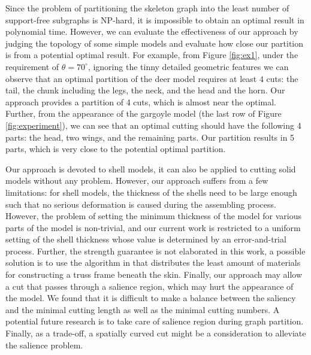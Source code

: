 Since the problem of partitioning the skeleton graph into the least number of support-free subgraphs is NP-hard, it is impossible to obtain an optimal result in polynomial time. However, we can evaluate the effectiveness of our approach by judging the topology of some simple models and evaluate how close our partition is from a potential optimal result. For example, from Figure \ref{fig:ex1}, under the requirement of $\theta = 70^{\circ}$, ignoring the tinny detailed geometric features we can observe that an optimal partition of the deer model requires at least $4$ cuts: the tail, the chunk including the legs, the neck, and the head and the horn. Our approach provides a partition of 4 cuts, which is almost near the optimal. Further, from the appearance of the gargoyle model (the last row of Figure \ref{fig:experiment}), we can see that an optimal cutting should have the following 4 parts: the head, two wings, and the remaining parts. Our partition results in 5 parts, which is very close to the potential optimal partition.

Our approach is devoted to shell models, it can also be applied to cutting solid models without any problem. However, our approach suffers from a few limitations: for shell models, the thickness of the shells need to be large enough such that no serious deformation is caused during the assembling process. However, the problem of setting the minimum thickness of the model for various parts of the model is non-trivial, and our current work is restricted to a uniform setting of the shell thickness whose value is determined by an error-and-trial process. Further, the strength guarantee is not elaborated in this work, a possible solution is to use the algorithm in \cite{WangWYLTTDCL13} that distributes the least amount of materials for constructing a truss frame beneath the skin. Finally, our approach may allow a cut that passes through a salience region, which may hurt the appearance of the model. We found that it is difficult to make a balance between the saliency and the minimal cutting length as well as the minimal cutting numbers. A potential future research is to take care of salience region during graph partition. Finally, as a trade-off, a spatially curved cut might be a consideration to alleviate the salience problem.
